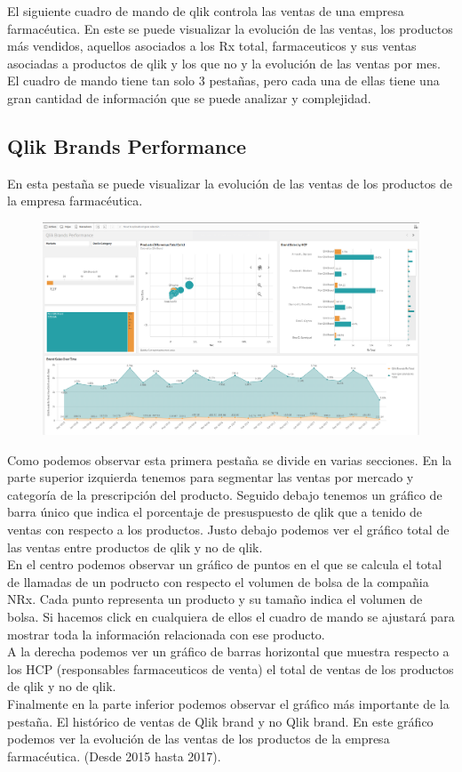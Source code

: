\documentclass[12pt]{article}
\begin{document}
El siguiente cuadro de mando de qlik controla las ventas de una empresa farmacéutica. En este se puede visualizar la evolución de las ventas, los productos más vendidos, 
aquellos asociados a los Rx total, farmaceuticos y sus ventas asociadas a productos de qlik y los que no y la evolución de las ventas por mes.
El cuadro de mando tiene tan solo 3 pestañas, pero cada una de ellas tiene una gran cantidad de información que se puede analizar y complejidad.

\subsection{Qlik Brands Performance}

En esta pestaña se puede visualizar la evolución de las ventas de los productos de la empresa farmacéutica.

\begin{figure}[h!]
    \centering
    \includegraphics[width=.8\textwidth]{assets/qlik_1.PNG}
    \label{fig:my_label}
\end{figure}

Como podemos observar esta primera pestaña se divide en varias secciones. En la parte superior izquierda tenemos para segmentar
las ventas por mercado y categoría de la prescripción del producto. Seguido debajo tenemos un gráfico de barra único que indica
el porcentaje de presuspuesto de qlik que a tenido de ventas con respecto a los productos. Justo debajo podemos ver el gráfico
total de las ventas entre productos de qlik y no de qlik.
\\
En el centro podemos observar un gráfico de puntos en el que se calcula el total de llamadas de un podructo con respecto el volumen
de bolsa de la compañia NRx. Cada punto representa un producto y su tamaño indica el volumen de bolsa. Si hacemos click en cualquiera 
de ellos el cuadro de mando se ajustará para mostrar toda la información relacionada con ese producto.
\\
A la derecha podemos ver un gráfico de barras horizontal que muestra respecto a los HCP (responsables farmaceuticos de venta)
el total de ventas de los productos de qlik y no de qlik.
\\
Finalmente en la parte inferior podemos observar el gráfico más importante de la pestaña. El histórico de ventas de Qlik brand y 
no Qlik brand. En este gráfico podemos ver la evolución de las ventas de los productos de la empresa farmacéutica. (Desde 2015
hasta 2017).
\end{document}

